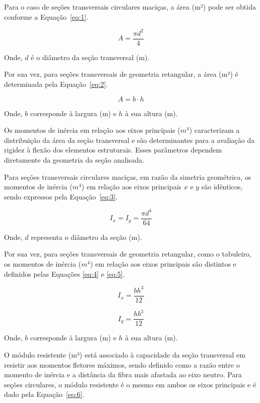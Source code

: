 Para o caso de seções transversais circulares maciças, a área (m²) pode ser obtida conforme a Equação~\eqref{eq:1}.

\begin{equation}
A = \frac{\pi d^2}{4}
\label{eq:1}
\end{equation}

Onde, \(d\) é o diâmetro da seção transversal (m).

Por sua vez, para seções transversais de geometria retangular, a área (m²) é determinada pela Equação~\eqref{eq:2}.

\begin{equation}
A = b \cdot h
\label{eq:2}
\end{equation}

Onde, \(b\) corresponde à largura (m) e \(h\) à sua altura (m).

Os momentos de inércia em relação aos eixos principais ($m^4$) caracterizam a distribuição da área da seção transversal e são determinantes para a avaliação da rigidez à flexão dos elementos estruturais. Esses parâmetros dependem diretamente da geometria da seção analisada.

Para seções transversais circulares maciças, em razão da simetria geométrica, os momentos de inércia ($m^4$) em relação aos eixos principais \(x\) e \(y\) são idênticos, sendo expressos pela Equação~\eqref{eq:3}.

\begin{equation}
I_x = I_y = \frac{\pi d^4}{64}
\label{eq:3}
\end{equation}

Onde, \(d\) representa o diâmetro da seção (m).

Por sua vez, para seções transversais de geometria retangular, como o tabuleiro, os momentos de inércia ($m^4$) em relação aos eixos principais são distintos e definidos pelas Equações \eqref{eq:4} e \eqref{eq:5}.

\begin{equation}
I_x = \frac{b h^3}{12}
\label{eq:4}
\end{equation}

\begin{equation}
I_y = \frac{h b^3}{12}
\label{eq:5}
\end{equation}

Onde, \(b\) corresponde à largura (m)  e \(h\) à sua altura (m).

O módulo resistente (m³) está associado à capacidade da seção transversal em resistir aos momentos fletores máximos, sendo definido como a razão entre o momento de inércia e a distância da fibra mais afastada ao eixo neutro. Para seções circulares, o módulo resistente é o mesmo em ambos os eixos principais e é dado pela Equação~\eqref{eq:6}.


